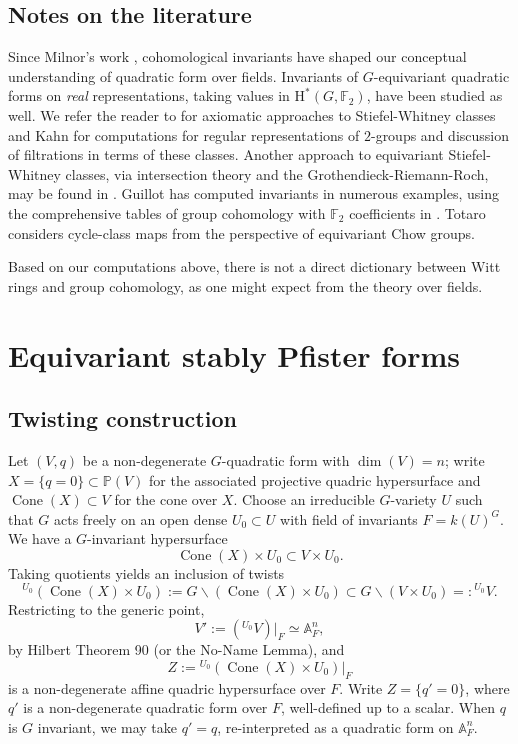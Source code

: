 \documentclass[12pt]{amsart}
\numberwithin{equation}{section}
\newcommand{\bA}{\mathbb{A}}
\newcommand{\bF}{\mathbb{F}}
\newcommand{\bP}{\mathbb{P}}
\newcommand{\rH}{\mathrm{H}}
\newcommand{\Cone}{\operatorname{Cone}}
\theoremstyle{plain}
\theoremstyle{definition}
\theoremstyle{remark}
\begin{document}
\subsection*{Notes on the literature}
Since Milnor's work \cite{Milnor}, cohomological invariants have shaped our conceptual understanding of quadratic form over fields.  Invariants of $G$-equivariant quadratic forms on {\em real} 
representations, taking values in $\rH^*(G,\bF_2)$, have been studied 
as well. We refer the reader to
\cite{GKT} for axiomatic approaches to Stiefel-Whitney classes
and Kahn \cite{Kahnreg1,Kahnreg2,Kahnreg3}
for computations for regular 
representations of $2$-groups and discussion
of filtrations in terms of
these classes.  
Another approach to equivariant Stiefel-Whitney classes, via intersection theory
and the Grothendieck-Riemann-Roch,
may be found in \cite{KozlowskiPAMS,KozlowskiRIMS}.
Guillot \cite{Guillot} has computed invariants
in numerous examples, using the 
comprehensive tables of group cohomology
with $\bF_2$ coefficients in \cite{CarlsonBook}.
Totaro \cite{Totarobook} considers 
cycle-class maps from the perspective of
equivariant Chow groups.

Based on our computations above, there is not a direct dictionary between Witt
rings and group cohomology, as one might
expect from the theory over fields. 

\section{Equivariant stably Pfister forms}
\label{sect:equipf}

\subsection*{Twisting construction}
Let $(V,q)$ be a non-degenerate $G$-quadratic form with 
$\dim(V)=n$; write $X=\{q=0\} \subset \bP(V)$
for the associated projective quadric hypersurface
and $\Cone(X) \subset V$ for the cone over $X$.
Choose an irreducible $G$-variety $U$ such that
$G$ acts freely on an open dense $U_0\subset U$
with field of invariants $F=k(U)^G$.  We have a
$G$-invariant hypersurface
$$\Cone(X) \times U_0 \subset V\times U_0.$$
Taking quotients yields an inclusion of twists
$${ }^{U_0} (\Cone(X)\times U_0) := G \backslash (\Cone(X)\times U_0) \subset G \backslash (V\times U_0)=: { }^{U_0}V.$$
Restricting to the generic point, 
$$
V':=  ({ }^{U_0}V)|_F\simeq \bA^n_F,
$$
by Hilbert Theorem 90 (or the No-Name Lemma), and
$$Z:= { }^{U_0}(\Cone(X)\times U_0)|_F$$
is a non-degenerate affine quadric hypersurface over $F$.
Write $Z=\{q'=0\}$, where $q'$ is a non-degenerate
quadratic form over $F$, well-defined up to a scalar. 
When $q$ is $G$ invariant, we may take $q'=q$, 
re-interpreted as
a quadratic form on $\bA^n_F$.
\end{document}
